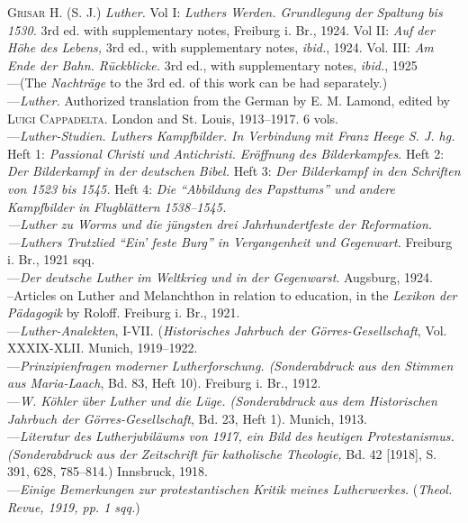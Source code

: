 \textsc{Grisar H.} (S. J.) \textit{Luther.} Vol I: \textit{Luthers Werden. Grundlegung der Spaltung
bis 1530.} 3rd ed. with supplementary notes, Freiburg i. Br., 1924. Vol II:
\textit{Auf der Höhe des Lebens,} 3rd ed., with supplementary notes, \textit{ibid.}, 1924.
Vol. III: \textit{Am Ende der Bahn. Rückblicke.} 3rd ed., with supplementary
notes, \textit{ibid.}, 1925 \\
---(The \textit{Nachträge} to the 3rd ed. of this work can be
had separately.) \\
---\textit{Luther.} Authorized translation from the German by E. M. Lamond,
edited by \textsc{Luigi Cappadelta}. London and St. Louis, 1913--1917. 6 vols. \\
---\textit{Luther-Studien. Luthers Kampfbilder. In Verbindung mit Franz Heege
S. J. hg.} \\
Heft 1: \textit{Passional Christi und Antichristi. Eröffnung des Bilderkampfes.}
Heft 2: \textit{Der Bilderkampf in der deutschen Bibel.}
Heft 3: \textit{Der Bilderkampf in den Schriften von 1523 bis 1545.}
Heft 4: \textit{Die “Abbildung des Papsttums” und andere Kampfbilder in Flugblättern 1538--1545. \\
---Luther zu Worms und die jüngsten drei Jahrhundertfeste der Reformation. \\
---Luthers Trutzlied “Ein’ feste Burg” in Vergangenheit und Gegenwart.}
Freiburg i. Br., 1921 sqq. \\
---\textit{Der deutsche Luther im Weltkrieg und in der Gegenwarst}. Augsburg,
1924. \\
--Articles on Luther and Melanchthon in relation to education, in the
\textit{Lexikon der Pädagogik} by Roloff. Freiburg i. Br., 1921. \\
---\textit{Luther-Analekten}, I-VII. (\textit{Historisches Jahrbuch der Görres-Gesellschaft},
Vol. XXXIX-XLII. Munich, 1919--1922. \\
---\textit{Prinzipienfragen moderner Lutherforschung. (Sonderabdruck aus den
Stimmen aus Maria-Laach}, Bd. 83, Heft 10). Freiburg i. Br., 1912. \\
---\textit{W. Köhler über Luther und die Lüge. (Sonderabdruck aus dem Historischen
Jahrbuch der Görres-Gesellschaft}, Bd. 23, Heft 1). Munich,
1913. \\
---\textit{Literatur des Lutherjubiläums von 1917, ein Bild des heutigen Protestanismus.
(Sonderabdruck aus der Zeitschrift für katholische Theologie,}
Bd. 42 [1918], S. 391, 628, 785--814.) Innsbruck, 1918. \\
---\textit{Einige Bemerkungen zur protestantischen Kritik meines Lutherwerkes.}
(\textit{Theol. Revue, 1919, pp. 1 sqq.}) \\

